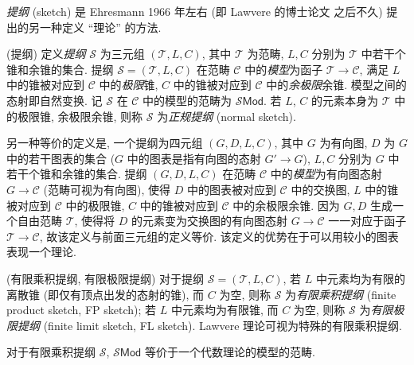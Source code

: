 \emph{提纲} (sketch) 是 Ehresmann 1966 年左右 (即 Lawvere 的博士论文 \cite{FSAT} 之后不久) 提出的另一种定义 ``理论'' 的方法.

\begin{definition}
	[label={sketches}]
	{(提纲)}
	定义\emph{提纲} $\mathscr S$ 为三元组 $(\mathcal T,L,C)$, 其中 $\mathcal T$ 为范畴, $L,C$ 分别为 $\mathcal T$ 中若干个锥和余锥的集合.
	提纲 $\mathscr S=(\mathcal T,L,C)$ 在范畴 $\mathcal C$ 中的\emph{模型}为函子 $\mathcal T\to\mathcal C$, 满足 $L$ 中的锥被对应到 $\mathcal C$ 中的\emph{极限}锥, $C$ 中的锥被对应到 $\mathcal C$ 中的\emph{余极限}余锥. 模型之间的态射即自然变换. 记 $\mathscr S$ 在 $\mathcal C$ 中的模型的范畴为 $\mathscr S\mathsf {Mod}$.
	若 $L$, $C$ 的元素本身为 $\mathcal T$ 中的极限锥, 余极限余锥, 则称 $\mathscr S$ 为\emph{正规提纲} (normal sketch).
	
	{\small 另一种等价的定义是, 一个提纲为四元组 $(G,D,L,C)$, 其中 $G$ 为有向图, $D$ 为 $G$ 中的若干图表的集合 ($G$ 中的图表是指有向图的态射 $G'\to G$), $L,C$ 分别为 $G$ 中若干个锥和余锥的集合.
	提纲 $(G,D,L,C)$ 在范畴 $\mathcal C$ 中的\emph{模型}为有向图态射 $G\to\mathcal C$ (范畴可视为有向图), 使得 $D$ 中的图表被对应到 $\mathcal C$ 中的交换图, $L$ 中的锥被对应到 $\mathcal C$ 中的极限锥, $C$ 中的锥被对应到 $\mathcal C$ 中的余极限余锥. 因为 $G,D$ 生成一个自由范畴 $\mathcal T$, 使得将 $D$ 的元素变为交换图的有向图态射 $G\to \mathcal C$ 一一对应于函子 $\mathcal T\to \mathcal C$, 故该定义与前面三元组的定义等价. 该定义的优势在于可以用较小的图表表现一个理论.}
\end{definition}



\begin{definition}
	{(有限乘积提纲, 有限极限提纲)}
	对于提纲 $\mathscr S=(\mathcal T,L,C)$, 若 $L$ 中元素均为有限的离散锥 (即仅有顶点出发的态射的锥), 而 $C$ 为空, 则称 $\mathscr S$ 为\emph{有限乘积提纲} (finite product sketch, FP sketch); 若 $L$ 中元素均为有限锥, 而 $C$ 为空, 则称 $\mathscr S$ 为\emph{有限极限提纲} (finite limit sketch, FL sketch). Lawvere 理论可视为特殊的有限乘积提纲.
\end{definition}

对于有限乘积提纲 $\mathscr S$, $\mathscr S\mathsf {Mod}$ 等价于一个代数理论的模型的范畴.


